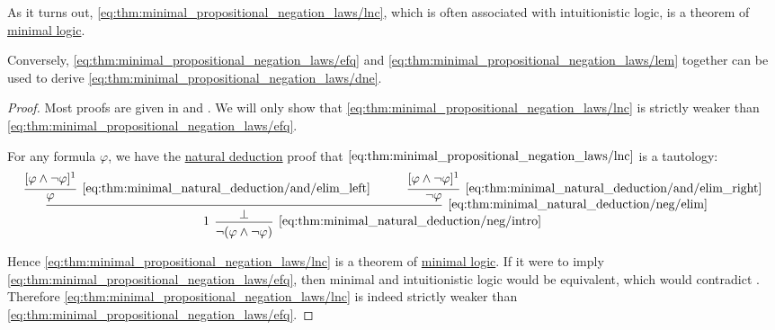 \begin{theorem}
  As it turns out, \eqref{eq:thm:minimal_propositional_negation_laws/lnc}, which is often associated with intuitionistic logic, is a theorem of \hyperref[def:minimal_logic]{minimal logic}.

  Conversely, \eqref{eq:thm:minimal_propositional_negation_laws/efq} and \eqref{eq:thm:minimal_propositional_negation_laws/lem} together can be used to derive \eqref{eq:thm:minimal_propositional_negation_laws/dne}.
\end{theorem}
\begin{proof}
  Most proofs are given in \cite[prop. 3]{DienerMcKubreJordens2016} and \cite[prop. 13]{DienerMcKubreJordens2016}. We will only show that \eqref{eq:thm:minimal_propositional_negation_laws/lnc} is strictly weaker than \eqref{eq:thm:minimal_propositional_negation_laws/efq}.

  For any formula \( \varphi \), we have the \hyperref[thm:minimal_natural_deduction]{natural deduction} proof that \( \eqref{eq:thm:minimal_propositional_negation_laws/lnc} \) is a tautology:
  \begin{equation*}
    \begin{prooftree}[separation=3em]
      \hypo{ [\varphi \wedge \neg \varphi]^1 }
      \infer1[\ref{eq:thm:minimal_natural_deduction/and/elim_left}]{ \varphi }

      \hypo{ [\varphi \wedge \neg \varphi]^1 }
      \infer1[\ref{eq:thm:minimal_natural_deduction/and/elim_right}]{ \neg \varphi }

      \infer2[\ref{eq:thm:minimal_natural_deduction/neg/elim}]{ \bot }

      \infer[left label=\( 1 \)]1[\ref{eq:thm:minimal_natural_deduction/neg/intro}]{ \neg (\varphi \wedge \neg \varphi) }
    \end{prooftree}
  \end{equation*}

  Hence \eqref{eq:thm:minimal_propositional_negation_laws/lnc} is a theorem of \hyperref[def:minimal_logic]{minimal logic}. If it were to imply \eqref{eq:thm:minimal_propositional_negation_laws/efq}, then minimal and intuitionistic logic would be equivalent, which would contradict \cite[prop. 3]{DienerMcKubreJordens2016}. Therefore \eqref{eq:thm:minimal_propositional_negation_laws/lnc} is indeed strictly weaker than \eqref{eq:thm:minimal_propositional_negation_laws/efq}.
\end{proof}

\smallskip

